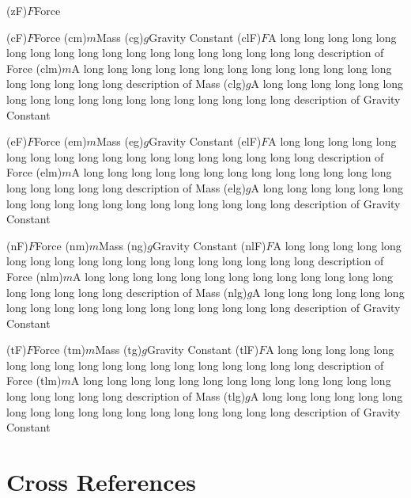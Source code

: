 \documentclass[10pt,a4paper,extrafontsizes,oldfontcommands,oneside]{memoir}
\begin{document}
\glossary(zF){$F$}{Force}

\glossary(cF){$F$}{Force}
\glossary(cm){$m$}{Mass}
\glossary(cg){$g$}{Gravity Constant}
\glossary(clF){$F$}{A long long long long long long long long long long long long long long long long long long description of Force}
\glossary(clm){$m$}{A long long long long long long long long long long long long long long long long long long description of Mass}
\glossary(clg){$g$}{A long long long long long long long long long long long long long long long long long long description of Gravity Constant}

\glossary(eF){$F$}{Force}
\glossary(em){$m$}{Mass}
\glossary(eg){$g$}{Gravity Constant}
\glossary(elF){$F$}{A long long long long long long long long long long long long long long long long long long description of Force}
\glossary(elm){$m$}{A long long long long long long long long long long long long long long long long long long description of Mass}
\glossary(elg){$g$}{A long long long long long long long long long long long long long long long long long long description of Gravity Constant}

\glossary(nF){$F$}{Force}
\glossary(nm){$m$}{Mass}
\glossary(ng){$g$}{Gravity Constant}
\glossary(nlF){$F$}{A long long long long long long long long long long long long long long long long long long description of Force}
\glossary(nlm){$m$}{A long long long long long long long long long long long long long long long long long long description of Mass}
\glossary(nlg){$g$}{A long long long long long long long long long long long long long long long long long long description of Gravity Constant}

\glossary(tF){$F$}{Force}
\glossary(tm){$m$}{Mass}
\glossary(tg){$g$}{Gravity Constant}
\glossary(tlF){$F$}{A long long long long long long long long long long long long long long long long long long description of Force}
\glossary(tlm){$m$}{A long long long long long long long long long long long long long long long long long long description of Mass}
\glossary(tlg){$g$}{A long long long long long long long long long long long long long long long long long long description of Gravity Constant}


\section{Cross References} %
\label{sec:cross_references}
\end{document}
